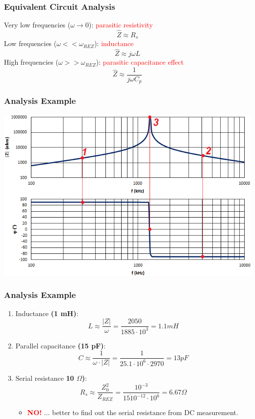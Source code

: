 \documentclass{beamer}
\begin{document}
	\begin{frame}
    \frametitle{Equivalent Circuit Analysis}
		Very low frequencies ($\omega \rightarrow 0$): \textcolor{red}{parasitic resistivity}
		$$\hat{Z}\approx R_s$$
		Low frequencies ($\omega << \omega_{REZ}$): \textcolor{red}{inductance}
		$$\hat{Z}\approx j\omega L$$
		High frequencies ($\omega >> \omega_{REZ}$): \textcolor{red}{parasitic capacitance effect}
		$$\hat{Z}\approx \frac{1}{j\omega C_p}$$
	\end{frame}
	\begin{frame}
    \frametitle{Analysis Example}
		
		\begin{center}
			\includegraphics[scale=0.6]{obr11_prikladL.png}
		\end{center}
	\end{frame}
	\begin{frame}
    \frametitle{Analysis Example}
		
		\begin{enumerate}
		\setcounter{enumi}{0}
			\item Inductance \textbf{(1 mH)}: $$L\approx \frac{\left|Z\right|}{\omega}= \frac{2050}{1885\cdot 10^3}= 1.1 mH$$
			\item Parallel capacitance \textbf{(15 pF)}: $$C\approx \frac{1}{\omega \cdot \left|Z\right|}= \frac{1}{25.1\cdot 10^6\cdot2970}= 13 pF$$
			\item Serial resistance \textbf{10 $\Omega$)}: $$R_s \approx \frac{Z_0^2}{Z_{REZ}}=\frac{10^{-3}}{15\dot 10^{-12}\cdot 10^6}= 6.67 \Omega$$
			
			\begin{itemize}
				\item \large\textbf{\textcolor{red}{NO!}} \small... better to find out the serial resistance from DC measurement.
			\end{itemize}
		\end{enumerate}
	\end{frame}
\end{document}
